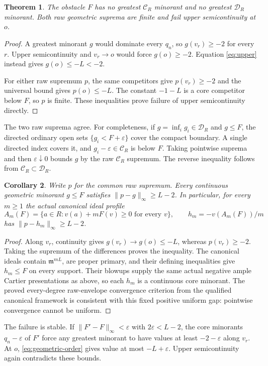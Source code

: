 \documentclass[11pt]{article}
\newtheorem{theorem}{Theorem}
\newtheorem{corollary}[theorem]{Corollary}
\newcommand{\m}{\mathfrak m}
\newcommand{\Cc}{\mathcal C}
\newcommand{\Dd}{\mathcal D}
\begin{document}
\begin{theorem}\label{th:failure}
The obstacle $F$ has no greatest $\Cc_R$ minorant and no greatest
$\Dd_R$ minorant. Both raw geometric suprema are finite and fail
upper semicontinuity at $o$.
\end{theorem}
\begin{proof}
A greatest minorant $g$ would dominate every $q_n$, so
$g(v_r)\ge-2$ for every $r$. Upper semicontinuity and $v_r\to o$
would force $g(o)\ge-2$. Equation \eqref{eq:upper} instead gives
$g(o)\le-L<-2$.

For either raw supremum $p$, the same competitors give $p(v_r)\ge-2$
and the universal bound gives $p(o)\le-L$. The constant $-1-L$
is a core competitor below $F$, so $p$ is finite. These inequalities
prove failure of upper semicontinuity directly.
\end{proof}

The two raw suprema agree. For completeness, if
$g=\inf_i g_i\in\Dd_R$ and $g\le F$, the directed ordinary open sets
$\{g_i<F+\varepsilon\}$ cover the compact boundary.
A single directed index covers it, and
$g_i-\varepsilon\in\Cc_R$ is below $F$. Taking pointwise suprema
and then $\varepsilon\downarrow0$ bounds $g$ by the raw
$\Cc_R$ supremum. The reverse inequality follows from
$\Cc_R\subset\Dd_R$.

\begin{corollary}\label{cor:gap}
Write $p$ for the common raw supremum. Every continuous geometric
minorant $g\le F$ satisfies
$\|p-g\|_\infty\ge L-2$.
In particular, for every $m\ge1$ the actual canonical ideal profile
\[
 A_m(F)=\{a\in R:v(a)+mF(v)\ge0\text{ for every }v\},\qquad
 h_m=-v(A_m(F))/m
\]
has $\|p-h_m\|_\infty\ge L-2$.
\end{corollary}
\begin{proof}
Along $v_r$, continuity gives
$g(v_r)\to g(o)\le-L$, whereas $p(v_r)\ge-2$.
Taking the supremum of the differences proves the inequality.
The canonical ideals contain $\m^{mL}$, are proper primary, and
their defining inequalities give $h_m\le F$ on every support.
Their blowups supply the same actual negative ample Cartier
presentations as above, so each $h_m$ is a continuous core minorant.
The proved every-degree raw-envelope convergence criterion from the
qualified canonical framework is consistent with this fixed positive
uniform gap: pointwise convergence cannot be uniform.
\end{proof}

The failure is stable. If $\|F'-F\|_\infty<\varepsilon$ with
$2\varepsilon<L-2$, the core minorants $q_n-\varepsilon$ of $F'$
force any greatest minorant to have values at least
$-2-\varepsilon$ along $v_r$. At $o$, \eqref{eq:geometric-order}
gives value at most $-L+\varepsilon$. Upper semicontinuity again
contradicts these bounds.
\end{document}
